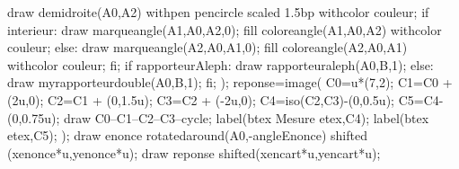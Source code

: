 {\begin{Geometrie}[CoinBG=\RapporteursCoinBG,CoinHD=\RapporteursCoinHD]
       draw demidroite(A0,A2) withpen pencircle scaled 1.5bp withcolor couleur;
       if interieur:
          draw marqueangle(A1,A0,A2,0);
          fill coloreangle(A1,A0,A2) withcolor couleur;
       else:
          draw marqueangle(A2,A0,A1,0);
          fill coloreangle(A2,A0,A1) withcolor couleur;
       fi;
       if rapporteurAleph:
          draw rapporteuraleph(A0,B,1);
       else:
          draw myrapporteurdouble(A0,B,1);
       fi;
    );
    reponse=image(
       C0=u*(7,2);
       C1=C0 + (2u,0); 
       C2=C1 + (0,1.5u);
       C3=C2 + (-2u,0);
       C4=iso(C2,C3)-(0,0.5u);
       C5=C4-(0,0.75u);
       draw C0--C1--C2--C3--cycle;
       label(btex Mesure etex,C4);
       label(btex \makebox[0.2\linewidth]{\dotfill} etex,C5);      
    );
    draw enonce rotatedaround(A0,-angleEnonce) shifted (xenonce*u,yenonce*u);
    draw reponse shifted(xencart*u,yencart*u);     
 \end{Geometrie}
}

